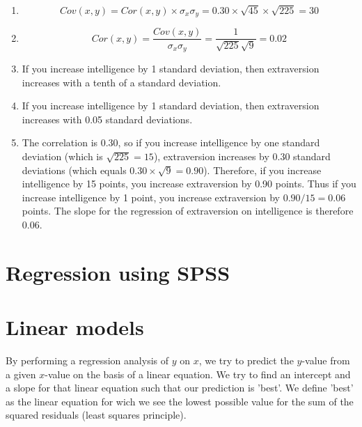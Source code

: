 \documentclass[]{report}\usepackage[]{graphicx}\usepackage[]{color}
\begin{document}
\begin{enumerate}

\item

\begin{equation}
Cov(x,y)= Cor(x,y) \times \sigma_x \sigma_y= 0.30 \times \sqrt{45}\times \sqrt{225}=30
\end{equation}



\item

\begin{equation}
Cor(x,y)= \frac{Cov(x,y)} { \sigma_x \sigma_y}= \frac{1} { \sqrt{225} \sqrt{9}}=0.02
\end{equation}

\item
If you increase intelligence by 1 standard deviation, then extraversion increases with a tenth of a standard deviation.

\item
If you increase intelligence by 1 standard deviation, then extraversion increases with 0.05 standard deviations.

\item
The correlation is 0.30, so if you increase intelligence by one standard deviation (which is $\sqrt{225}=15$), extraversion increases by 0.30 standard deviations (which equals $0.30 \times \sqrt{9}=0.90$). Therefore, if you increase intelligence by 15 points, you increase extraversion by 0.90 points. Thus if you increase intelligence by 1 point, you increase extraversion by $0.90/15=0.06$ points. The slope for the regression of extraversion on intelligence is therefore 0.06.


\end{enumerate}


\section{Regression using SPSS}



\section{Linear models}

By performing a regression analysis of $y$ on $x$, we try to predict the $y$-value from a given $x$-value on the basis of a linear equation. We try to find an intercept and a slope for that linear equation such that our prediction is 'best'. We define 'best' as the linear equation for wich we see the lowest possible value for the sum of the squared residuals (least squares principle).
\end{document}

